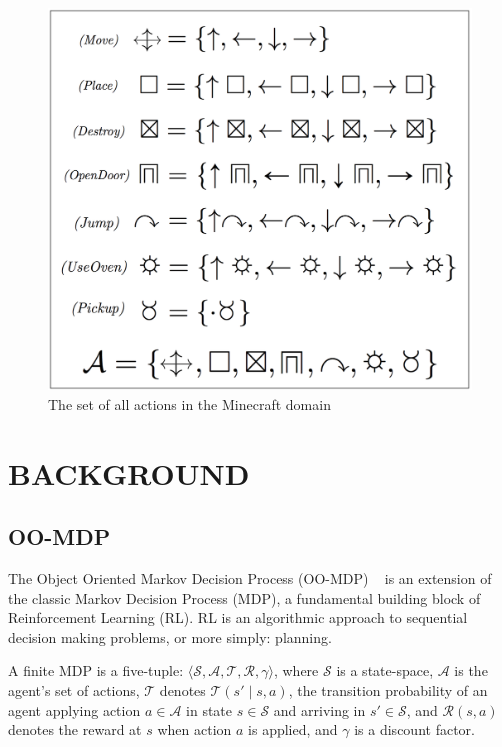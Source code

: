 \documentclass[]{article}
\begin{document}
\begin{figure}
\centering
\includegraphics[scale = 0.15]{figures/all_actions.png}
\caption{The set of all actions in the Minecraft domain \label{fig:all_actions}}
\end{figure}

\section{BACKGROUND}

\subsection{OO-MDP}

The Object Oriented Markov Decision Process 
(OO-MDP) ~\citep{diuk08} is an extension of the classic
Markov Decision Process (MDP), a fundamental building 
block of Reinforcement Learning (RL). RL is an algorithmic 
approach to sequential decision making problems, or more simply: planning.

A finite MDP is a five-tuple: $\langle \mathcal{S}, \mathcal{A}, 
\mathcal{T}, \mathcal{R}, \gamma \rangle$, where $\mathcal{S}$
is a state-space, $\mathcal{A}$ is the agent's set of actions, 
$\mathcal{T}$ denotes $\mathcal{T}(s' \mid s,a)$, the transition
probability of an agent applying action $a \in \mathcal{A}$ in 
state $s \in \mathcal{S}$ and arriving in $s' \in \mathcal{S}$, 
and $\mathcal{R}(s,a)$ denotes the reward at $s$ when action
$a$ is applied, and $\gamma$ is a discount factor.
\end{document}
